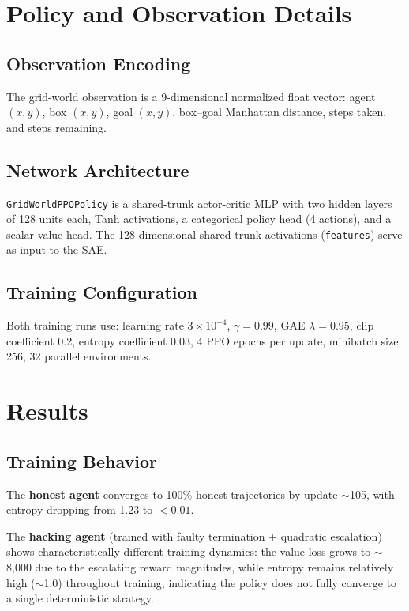 \documentclass[11pt]{article}
\begin{document}
\section{Policy and Observation Details}

\subsection{Observation Encoding}

The grid-world observation is a 9-dimensional normalized float vector: agent $(x,y)$, box $(x,y)$, goal $(x,y)$, box--goal Manhattan distance, steps taken, and steps remaining.

\subsection{Network Architecture}

\texttt{GridWorldPPOPolicy} is a shared-trunk actor-critic MLP with two hidden layers of 128 units each, Tanh activations, a categorical policy head (4 actions), and a scalar value head.  The 128-dimensional shared trunk activations (\texttt{features}) serve as input to the SAE.

\subsection{Training Configuration}

Both training runs use: learning rate $3 \times 10^{-4}$, $\gamma = 0.99$, GAE $\lambda = 0.95$, clip coefficient 0.2, entropy coefficient 0.03, 4 PPO epochs per update, minibatch size 256, 32 parallel environments.

\section{Results}

\subsection{Training Behavior}

The \textbf{honest agent} converges to 100\% honest trajectories by update $\sim$105, with entropy dropping from 1.23 to $< 0.01$.

The \textbf{hacking agent} (trained with faulty termination + quadratic escalation) shows characteristically different training dynamics: the value loss grows to $\sim$8{,}000 due to the escalating reward magnitudes, while entropy remains relatively high ($\sim$1.0) throughout training, indicating the policy does not fully converge to a single deterministic strategy.
\end{document}
